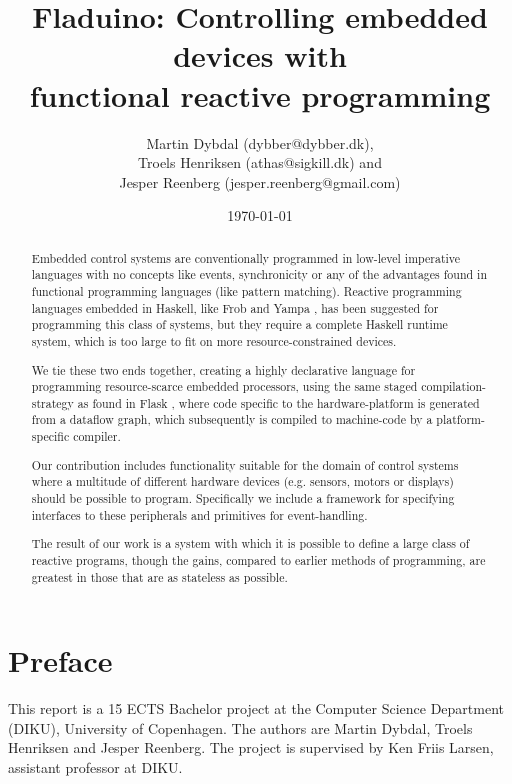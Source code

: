 \documentclass[a4paper, oneside, final]{memoir}
\title{Fladuino: Controlling embedded devices with\\ functional reactive programming}
\author{Martin Dybdal (dybber@dybber.dk), \\
Troels Henriksen (athas@sigkill.dk) and \\
Jesper Reenberg (jesper.reenberg@gmail.com)
}
\date{\today}
\begin{document}
\frontmatter

\maketitle
\thispagestyle{empty}

\begin{abstract}
  Embedded control systems are conventionally programmed in low-level
  imperative languages with no concepts like events, synchronicity or
  any of the advantages found in functional programming languages
  (like pattern matching). Reactive programming languages embedded in
  Haskell, like Frob \cite{frob99} and Yampa \cite{arrowsrobotsfrp02},
  has been suggested for programming this class of systems, but they
  require a complete Haskell runtime system, which is too large to fit
  on more resource-constrained devices.

  We tie these two ends together, creating a highly declarative
  language for programming resource-scarce embedded processors, using
  the same staged com\-pi\-la\-tion-strategy as found in Flask
  \cite{flask08}, where code specific to the hardware-platform is
  generated from a dataflow graph, which subsequently is compiled to
  machine-code by a platform-specific compiler.

  Our contribution includes functionality suitable for the domain of
  control systems where a multitude of different hardware devices
  (e.g. sensors, motors or displays) should be possible to
  program. Specifically we include a framework for specifying
  interfaces to these peripherals and primitives for
  event-handling.

  The result of our work is a system with which it is possible to
  define a large class of reactive programs, though the gains,
  compared to earlier methods of programming, are greatest in those
  that are as stateless as possible.
\end{abstract}

\clearpage 
\chapter*{Preface}
This report is a 15 ECTS Bachelor project at the Computer Science
Department (DIKU), University of Copenhagen. The authors are Martin
Dybdal, Troels Henriksen and Jesper Reenberg. The project is
supervised by Ken Friis Larsen, assistant professor at DIKU.

\clearpage

\tableofcontents*
\end{document}
